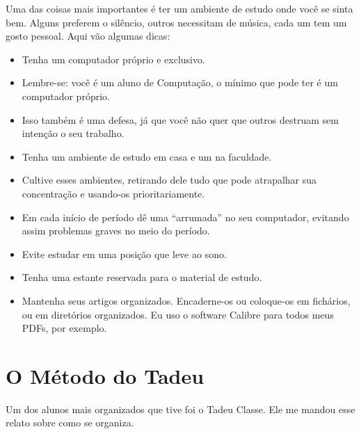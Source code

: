 Uma das coisas mais importantes é ter um ambiente de estudo onde você se sinta bem. Alguns preferem o silêncio, outros necessitam de música, cada um tem um gosto pessoal. Aqui vão algumas dicas: 

\begin{itemize}
\item	Tenha um computador próprio e exclusivo. 


\item	Lembre-se: você é um aluno de Computação, o mínimo que pode ter é um computador próprio.


\item	Isso também é uma defesa, já que você não quer que outros destruam sem intenção o seu trabalho.


\item	Tenha um ambiente de estudo em casa e um na faculdade. 


\item	Cultive esses ambientes, retirando dele tudo que pode atrapalhar sua concentração e usando-os prioritariamente. 


\item	Em cada início de período dê uma “arrumada” no seu computador, evitando assim problemas graves no meio do período. 


\item	Evite estudar em uma posição que leve ao sono. 


\item	Tenha uma estante reservada para o material de estudo. 


\item	Mantenha seus artigos organizados. Encaderne-os ou coloque-os em fichários, ou em diretórios organizados. Eu uso o software Calibre para todos meus PDFs, por exemplo.
\end{itemize}

\section{O Método do Tadeu}


Um dos alunos mais organizados que tive foi o Tadeu Classe. Ele me mandou esse relato sobre como se organiza.


